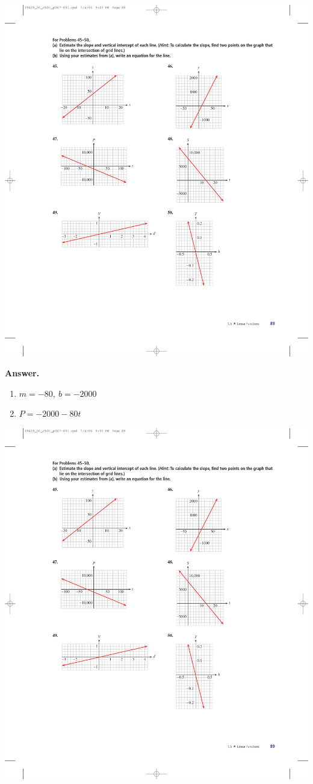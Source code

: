 \documentclass[10pt,]{book}
\theoremstyle{plain}
\theoremstyle{definition}
\theoremstyle{definition}
\theoremstyle{definition}
\theoremstyle{definition}
\numberwithin{equation}{part}
\begin{document}
\begin{exerciselist}
\begin{exercisegroup}
%
\exercise[47.]\hypertarget{exercise-333}{}\includegraphics[width=0.6\linewidth]{images/fig-ex-1-5-47}
%
\par\smallskip
\noindent\textbf{Answer.}\hypertarget{answer-187}{}\quad
\leavevmode%
\begin{enumerate}[label=*\alph**]
\item\hypertarget{li-1243}{}\(m = -80, ~b = -2000\)%
\item\hypertarget{li-1244}{}\(P = -2000 - 80t\)%
\end{enumerate}
%
\exercise[48.]\hypertarget{exercise-334}{}\includegraphics[width=0.5\linewidth]{images/fig-ex-1-5-48}
%

\end{exercisegroup}
\end{exerciselist}
\end{document}
